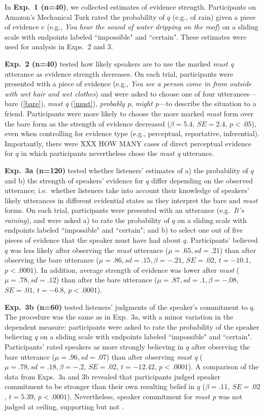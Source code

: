 \documentclass[11pt]{article}
\begin{document}
In \textbf{Exp.~1 (n=40)}, we collected estimates of evidence strength. Participants on Amazon's Mechanical Turk rated the probability of $q$ (e.g., of rain) given a piece of evidence $e$ (e.g., \emph{You hear the sound of water dripping on the roof}) on a sliding scale with endpoints labeled ``impossible" and ``certain". These estimates were used for analysis in Exps.~2 and 3.

\textbf{Exp.~2 (n=40)} tested how likely speakers are to use the marked \emph{must q} utterance as evidence strength decreases. On each trial, participants were presented with a piece of evidence (e.g., \emph{You see a person come in from outside with wet hair and wet clothes}) and were asked to choose one of four utterances---bare (\ref{bare}), \emph{must q} (\ref{must}), \emph{probably p}, \emph{might p}---to describe the situation to a friend. Participants were more likely to choose the more marked \emph{must} form over the bare form as the strength of evidence decreased ($\beta=5.4$, $SE=2.4$, $p<.05$), even when controlling for evidence type (e.g., perceptual, reportative, inferential). Importantly, there were XXX HOW MANY cases of direct perceptual evidence for $q$ in which participants nevertheless chose the \emph{must q} utterance.

\textbf{Exp.~3a (n=120)} tested whether listeners' estimates of a) the probability of $q$ and b) the strength of speakers' evidence for $q$ differ depending on the observed utterance; i.e.~whether listeners take into account their knowledge of speakers' likely utterances in different evidential states as they interpret the bare and \emph{must} forms. On each trial, participants were presented with an utterance (e.g.~\emph{It's raining}), and were asked a) to rate the probability of $q$ on a sliding scale with endpoints labeled ``impossible" and ``certain"; and b) to select one out of five pieces of evidence that the speaker must have had about $q$. Participants' believed $q$ was less likely after observing the \emph{must} utterance ($\mu=.65,sd=.21$) than after observing the bare utterance ($\mu=.86,sd=.15, \beta=-.21$, $SE=.02$, $t=-10.1$, $p<.0001$). In addition, average strength of evidence was lower after \emph{must} ($\mu=.78,sd=.12$) than after the bare utterance ($\mu=.87,sd=.1, \beta=-.08$, $SE=.01$, $t=-6.8$, $p<.0001$).

\textbf{Exp.~3b (n=60)} tested listeners' judgments of the speaker's commitment to $q$. The procedure was the same as in Exp.~3a, with a minor variation in the dependent measure: participants were asked to rate the probability of the speaker believing $q$ on a sliding scale with endpoints labeled ``impossible" and ``certain". Participants' rated speakers as more strongly believing in $q$ after observing the bare utterance ($\mu=.96,sd=.07$) than after observing  \emph{must q}  ($\mu=.78,sd=.18, \beta=-.2$, $SE=.02$, $t=-12.42$, $p<.0001$). A comparison of the data from Exps.~3a and 3b revealed that participants judged speaker commitment to be stronger than their own resulting belief in $q$ ($\beta=.11$, $SE=.02$, $t=5.39$, $p<.0001$). Nevertheless, speaker commitment for \emph{must p} was not judged at ceiling, supporting  but not .
\end{document}
